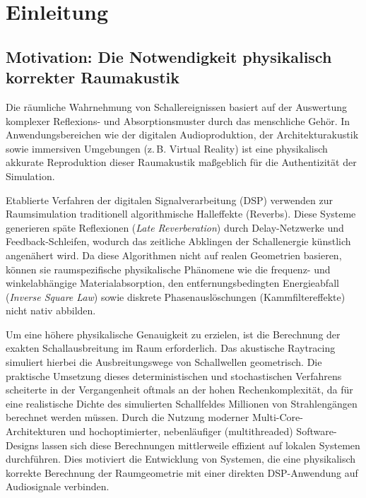 \documentclass{article}
\begin{document}
    \section{Einleitung}
    \label{sec:einleitung}

    \subsection{Motivation: Die Notwendigkeit physikalisch korrekter Raumakustik}
    \label{subsec:motivation}

    Die räumliche Wahrnehmung von Schallereignissen basiert auf der Auswertung komplexer Reflexions- und Absorptionsmuster durch das menschliche Gehör.
    In Anwendungsbereichen wie der digitalen Audioproduktion,
    der Architekturakustik sowie immersiven Umgebungen (z.\,B. Virtual Reality) ist eine physikalisch akkurate Reproduktion dieser Raumakustik maßgeblich für die Authentizität der Simulation.

    Etablierte Verfahren der digitalen Signalverarbeitung (DSP) verwenden zur Raumsimulation traditionell algorithmische Halleffekte (Reverbs).
    Diese Systeme generieren späte Reflexionen (\textit{Late Reverberation}) durch Delay-Netzwerke und Feedback-Schleifen, wodurch das zeitliche Abklingen der Schallenergie künstlich angenähert wird.
    Da diese Algorithmen nicht auf realen Geometrien basieren, können sie raumspezifische physikalische Phänomene wie die frequenz- und winkelabhängige Materialabsorption,
    den entfernungsbedingten Energieabfall (\textit{Inverse Square Law}) sowie diskrete Phasenauslöschungen (Kammfiltereffekte) nicht nativ abbilden.


    Um eine höhere physikalische Genauigkeit zu erzielen, ist die Berechnung der exakten Schallausbreitung im Raum erforderlich.
    Das akustische Raytracing simuliert hierbei die Ausbreitungswege von Schallwellen geometrisch.
    Die praktische Umsetzung dieses deterministischen und stochastischen Verfahrens scheiterte in der Vergangenheit oftmals an der hohen Rechenkomplexität,
    da für eine realistische Dichte des simulierten Schallfeldes Millionen von Strahlengängen berechnet werden müssen.
    Durch die Nutzung moderner Multi-Core-Architekturen und hochoptimierter, nebenläufiger (multithreaded) Software-Designs lassen sich diese Berechnungen mittlerweile effizient auf lokalen Systemen durchführen.
    Dies motiviert die Entwicklung von Systemen, die eine physikalisch korrekte Berechnung der Raumgeometrie mit einer direkten DSP-Anwendung auf Audiosignale verbinden.
\end{document}
